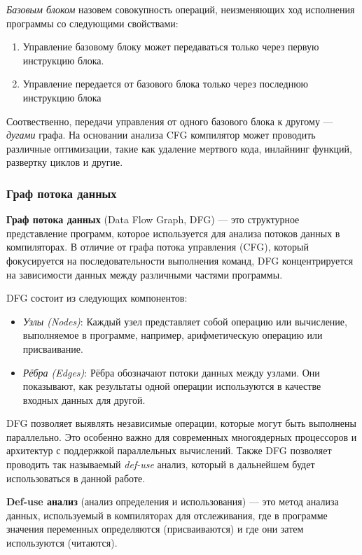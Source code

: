 \textit{Базовым блоком} назовем совокупность операций, неизменяющих ход исполнения программы со следующими свойствами:
\begin{enumerate}
    \item Управление базовому блоку может передаваться только через первую инструкцию блока.
    \item Управление передается от базового блока только через последнюю инструкцию блока
\end{enumerate}

Соотвественно, передачи управления от одного базового блока к другому — \textit{дугами} графа. На основании анализа CFG компилятор может проводить различные оптимизации, такие как удаление мертвого кода, инлайнинг функций, развертку циклов и другие.

\subsubsection{Граф потока данных}

\textbf{Граф потока данных} (Data Flow Graph, DFG) — это структурное представление программ, которое используется для анализа потоков данных в компиляторах. В отличие от графа потока управления (CFG), который фокусируется на последовательности выполнения команд, DFG концентрируется на зависимости данных между различными частями программы.

DFG состоит из следующих компонентов:

\begin{itemize}
    \item \textit{Узлы (Nodes)}: Каждый узел представляет собой операцию или вычисление, выполняемое в программе, например, арифметическую операцию или присваивание.
    \item \textit{Рёбра (Edges)}: Рёбра обозначают потоки данных между узлами. Они показывают, как результаты одной операции используются в качестве входных данных для другой.
\end{itemize}

DFG позволяет выявлять независимые операции, которые могут быть выполнены параллельно. Это особенно важно для современных многоядерных процессоров и архитектур с поддержкой параллельных вычислений. Также DFG позволяет проводить так называемый \textit{def-use} анализ, который в дальнейшем будет использоваться в данной работе.

\textbf{Def-use анализ} (анализ определения и использования) — это метод анализа данных, используемый в компиляторах для отслеживания, где в программе значения переменных определяются (присваиваются) и где они затем используются (читаются).

